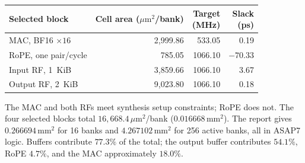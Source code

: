 \par\smallskip
{\centering\footnotesize\setlength{\tabcolsep}{4pt}
\begin{tabular}{@{}lrrr@{}}
\toprule
\textbf{Selected block} & \shortstack{\textbf{Cell area}\\($\mu\mathrm{m}^{2}$/bank)} & \shortstack{\textbf{Target}\\(MHz)} & \shortstack{\textbf{Slack}\\(ps)} \\
\midrule
MAC, BF16 $\times16$ & 2,999.86 & 533.05 & 0.19 \\
RoPE, one pair/cycle & 785.05 & 1066.10 & $-70.33$ \\
Input RF, 1~KiB & 3,859.66 & 1066.10 & 3.67 \\
Output RF, 2~KiB & 9,023.80 & 1066.10 & 0.18 \\
\bottomrule
\end{tabular}\par}\smallskip
The MAC and both RFs meet synthesis setup constraints; RoPE does not. The four selected blocks total $16{,}668.4\,\mu\mathrm{m}^{2}$/bank ($0.016668\,\mathrm{mm}^{2}$). The report gives $0.266694\,\mathrm{mm}^{2}$ for 16 banks and $4.267102\,\mathrm{mm}^{2}$ for 256 active banks, all in ASAP7 logic. Buffers contribute $77.3\%$ of the total; the output buffer contributes $54.1\%$, RoPE $4.7\%$, and the MAC approximately $18.0\%$.

